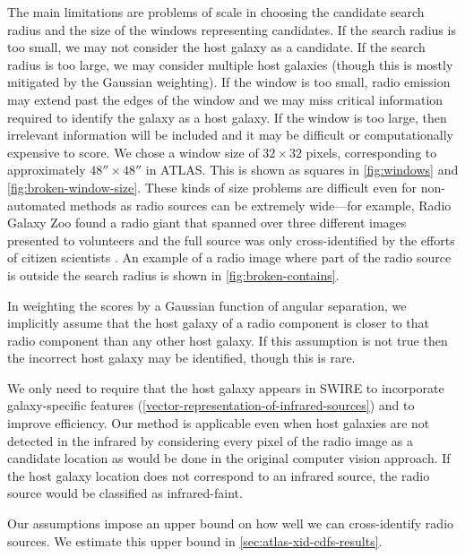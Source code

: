     {The main limitations are problems of scale in choosing the
    candidate search radius and the size of the windows
    representing candidates. If the search radius is too small, we may not
    consider the host galaxy as a candidate. If the search radius is too
    large, we may consider multiple host galaxies (though this is mostly
    mitigated by the Gaussian weighting). If the window is too small, radio
    emission may extend past the edges of the window and we may miss critical
    information required to identify the galaxy as a host galaxy. If the
    window is too large, then irrelevant information will be included and it
    may be difficult or computationally expensive to score. We chose a
    window size of $32 \times 32$ pixels, corresponding to approximately $48'' \times 48''$ in
    ATLAS. This is shown as squares in \autoref{fig:windows} and
    \autoref{fig:broken-window-size}. These kinds of size problems are
    difficult even for non-automated methods as radio sources can be extremely
    wide---for example, Radio Galaxy Zoo found a radio giant that spanned
    over three different images presented to volunteers and the full source
    was only cross-identified by the efforts of citizen scientists
    \citep{banfield15}. An example of a radio image where part of the radio
    source is outside the search radius is shown in
    \autoref{fig:broken-contains}.}

    In weighting the scores by a Gaussian function of angular
    separation, we implicitly assume that the host galaxy of a radio component
    is closer to that radio component than any other host galaxy. If this
    assumption is not true then the incorrect host galaxy may be identified, though
    this is rare.

    We only need to require that the host galaxy appears in SWIRE to
    incorporate galaxy-specific features
    (\autoref{vector-representation-of-infrared-sources}) and to improve
    efficiency. Our method is applicable even when host galaxies are not detected in
    the infrared by considering every pixel of the radio image as a candidate
    location as would be done in the original computer vision approach. {If the host galaxy location does not correspond to an infrared source, the radio source would be classified as infrared-faint.}

    Our assumptions impose an upper bound on how well we can cross-identify
    radio sources. We estimate this upper bound in \autoref{sec:atlas-xid-cdfs-results}.

